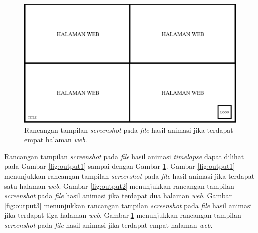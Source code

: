 \begin{figure}[H]
	\centering
		\includegraphics[scale=0.3]{Gambar/output_4.png}
	\caption{Rancangan tampilan \textit{screenshot} pada \textit{file} hasil animasi jika terdapat empat halaman \textit{web}.}
	\label{fig:output4}
\end{figure}



Rancangan tampilan \textit{screenshot} pada \textit{file} hasil animasi \textit{timelapse} dapat dilihat pada Gambar \ref{fig:output1} sampai dengan Gambar \ref{fig:output4}. Gambar \ref{fig:output1} menunjukkan rancangan tampilan \textit{screenshot} pada \textit{file} hasil animasi jika terdapat satu halaman \textit{web}. Gambar \ref{fig:output2} menunjukkan rancangan tampilan \textit{screenshot} pada \textit{file} hasil animasi jika terdapat dua halaman \textit{web}. Gambar \ref{fig:output3} menunjukkan rancangan tampilan \textit{screenshot} pada \textit{file} hasil animasi jika terdapat tiga halaman \textit{web}. Gambar \ref{fig:output4} menunjukkan rancangan tampilan \textit{screenshot} pada \textit{file} hasil animasi jika terdapat empat halaman \textit{web}. 

